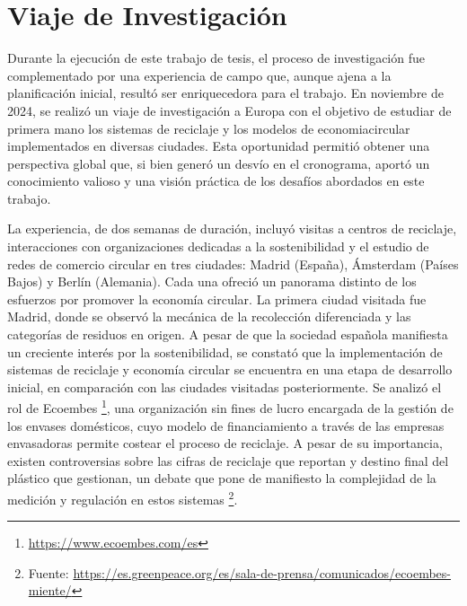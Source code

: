 \chapter{Viaje de Investigación}
\label{cp:europe-trip}

Durante la ejecución de este trabajo de tesis, el proceso de investigación fue complementado por una experiencia de campo que, aunque ajena a la planificación inicial, resultó ser enriquecedora para el trabajo. En noviembre de 2024, se realizó un viaje de investigación a Europa con el objetivo de estudiar de primera mano los sistemas de reciclaje y los modelos de \gls{economiacircular} implementados en diversas ciudades. Esta oportunidad permitió obtener una perspectiva global que, si bien generó un desvío en el cronograma, aportó un conocimiento valioso y una visión práctica de los desafíos abordados en este trabajo.

La experiencia, de dos semanas de duración, incluyó visitas a centros de reciclaje, interacciones con organizaciones dedicadas a la \gls{sostenibilidad} y el estudio de redes de comercio circular en tres ciudades: Madrid (España), Ámsterdam (Países Bajos) y Berlín (Alemania). Cada una ofreció un panorama distinto de los esfuerzos por promover la economía circular. La primera ciudad visitada fue Madrid, donde se observó la mecánica de la recolección diferenciada y las categorías de residuos en origen. A pesar de que la sociedad española manifiesta un creciente interés por la sostenibilidad, se constató que la implementación de sistemas de reciclaje y economía circular se encuentra en una etapa de desarrollo inicial, en comparación con las ciudades visitadas posteriormente. Se analizó el rol de Ecoembes \footnote{\url{https://www.ecoembes.com/es}}, una organización sin fines de lucro encargada de la gestión de los envases domésticos, cuyo modelo de financiamiento a través de las empresas envasadoras permite costear el proceso de reciclaje. A pesar de su importancia, existen controversias sobre las cifras de reciclaje que reportan y destino final del plástico que gestionan, un debate que pone de manifiesto la complejidad de la medición y regulación en estos sistemas \footnote{Fuente: \url{https://es.greenpeace.org/es/sala-de-prensa/comunicados/ecoembes-miente/}}.

